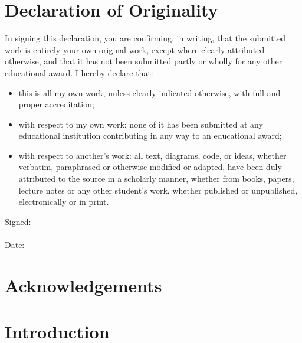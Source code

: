 \documentclass[12pt,pdftex,titlepage]{report}
\begin{document}
    \chapter*{Declaration of Originality}
        \begin{spacing}{1.0}
            In signing this declaration, you are confirming, in writing, that the submitted work
            is entirely your own original work, except where clearly attributed otherwise, and
            that it has not been submitted partly or wholly for any other educational award. I
            hereby declare that:
            \begin{itemize}
                \item this is all my own work, unless clearly indicated otherwise, with full and proper accreditation;  
                \item with respect to my own work: none of it has been submitted at any educational institution contributing in any way to an educational award;
                \item with respect to another’s work: all text, diagrams, code, or ideas, whether verbatim, paraphrased or otherwise modified or adapted, 
                have been duly attributed to the source in a scholarly manner, whether from books, papers, lecture notes or any other student’s work, whether
                published or unpublished, electronically or in print.
            \end{itemize}
            \vspace{10mm}
            Signed: \dotfill
            \\\\
            Date: \dotfill
        \end{spacing}

    \chapter*{Acknowledgements}
        \begin{spacing}{1.0}

        \end{spacing}
        
    \begin{spacing}{1.0}
        \tableofcontents
    \end{spacing}

    \chapter{Introduction}
    \setcounter{page}{1}
\end{document}
